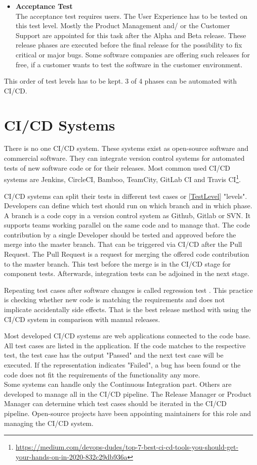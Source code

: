 \begin{itemize}
\item \textbf{Acceptance Test} \\
The acceptance test requires users. The User Experience has to be tested on this test level. Mostly the Product Management and/ or the Customer Support are appointed for this task after the Alpha and Beta release. These release phases are executed before the final release for the possibility to fix critical or major bugs.
Some software companies are offering such releases for free, if a customer wants to test the software in the customer environment.
\end{itemize}
This order of test levels has to be kept. 3 of 4 phases can be automated with CI/CD. 

\section{CI/CD Systems} \label{CI-CD}

There is no one CI/CD system. These systems exist as open-source software and commercial software. They can integrate version control systems for automated tests of new software code or for their releases. Most common used CI/CD systems are Jenkins, CircleCI, Bamboo, TeamCity, GitLab CI and Travis CI\footnote{\url{https://medium.com/devops-dudes/top-7-best-ci-cd-tools-you-should-get-your-hands-on-in-2020-832c29db936a}}.

CI/CD systems can split their tests in different test cases or \ref{TestLevel} "levels". Developers can define which test should run on which branch and in which phase. A branch is a code copy in a version control system as Github, Gitlab or SVN. It supports teams working parallel on the same code and to manage that. The code contribution by a single Developer should be tested and approved before the merge into the master branch. That can be triggered via CI/CD after the Pull Request. The Pull Request is a request for merging the offered code contribution to the master branch. This test before the merge is in the CI/CD stage for component tests. Afterwards, integration tests can be adjoined in the next stage.

Repeating test cases after software changes is called regression test \cite[~p.98]{Spillner2019}. This practice is checking whether new code is matching the requirements and does not implicate accidentally side effects. That is the best release method with using the CI/CD system in comparison with manual releases.

Most developed CI/CD systems are web applications connected to the code base. All test cases are listed in the application. If the code matches to the respective test, the test case has the output "Passed" and the next test case will be executed. If the representation indicates "Failed", a bug has been found or the code does not fit the requirements of the functionality any more. \\
Some systems can handle only the Continuous Integration part. Others are developed to manage all in the CI/CD pipeline.
The Release Manager or Product Manager can determine which test cases should be iterated in the CI/CD pipeline. Open-source projects have been appointing maintainers for this role and managing the CI/CD system.

